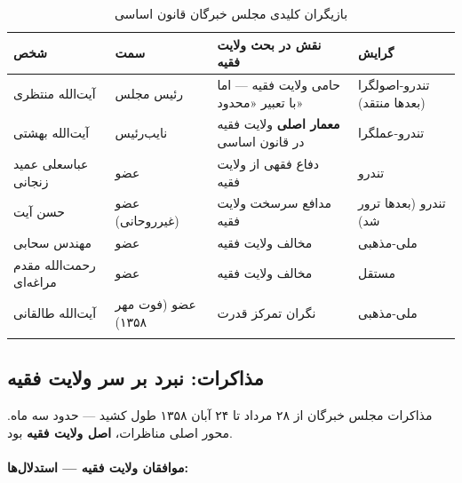 \documentclass[12pt,a4paper]{book}
\newcommand{\keyword}[1]{\textbf{\textcolor{cPrimary}{#1}}}
\begin{document}
\begin{longtable}{%
    >{\raggedleft\arraybackslash}p{}
    >{\raggedleft\arraybackslash}p{}
    >{\raggedleft\arraybackslash}p{}
    >{\raggedleft\arraybackslash}p{}}
\toprule
\rowcolor{cPrimary!10}
\textbf{شخص} & \textbf{سمت} & \textbf{نقش در بحث ولایت فقیه} & \textbf{گرایش} \\
\midrule
\endhead

آیت‌الله منتظری &
رئیس مجلس &
حامی ولایت فقیه — اما با تعبیر «محدود» &
تندرو-اصولگرا (بعدها منتقد) \\
\midrule

آیت‌الله بهشتی &
نایب‌رئیس &
\keyword{معمار اصلی} ولایت فقیه در قانون اساسی &
تندرو-عملگرا \\
\midrule

عباسعلی عمید زنجانی &
عضو &
دفاع فقهی از ولایت فقیه &
تندرو \\
\midrule

حسن آیت &
عضو (غیرروحانی) &
مدافع سرسخت ولایت فقیه &
تندرو (بعدها ترور شد) \\
\midrule

مهندس سحابی &
عضو &
مخالف ولایت فقیه &
ملی-مذهبی \\
\midrule

رحمت‌الله مقدم مراغه‌ای &
عضو &
مخالف ولایت فقیه &
مستقل \\
\midrule

آیت‌الله طالقانی &
عضو (فوت مهر ۱۳۵۸) &
نگران تمرکز قدرت &
ملی-مذهبی \\

\bottomrule
\caption{بازیگران کلیدی مجلس خبرگان قانون اساسی}
\label{tab:experts-actors}
\end{longtable}

\subsection{مذاکرات: نبرد بر سر ولایت فقیه}

مذاکرات مجلس خبرگان از ۲۸ مرداد تا ۲۴ آبان ۱۳۵۸ طول کشید — حدود سه ماه. محور اصلی مناظرات، \keyword{اصل ولایت فقیه} بود.

\paragraph{موافقان ولایت فقیه — استدلال‌ها:}
\end{document}
